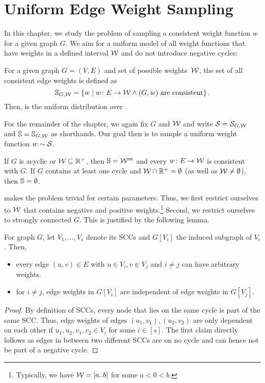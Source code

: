 \chapter{Uniform Edge Weight Sampling}\label{sec:uniform_sampling}

In this chapter, we study the problem of sampling a consistent weight function $w$ for a given graph $G$.
We aim for a uniform model of all weight functions that have weights in a defined interval $\mathcal W$ and do not introduce negative cycles:

\begin{definition}
  For a given graph $G = (V, E)$ and set of possible weights~$\mathcal W$, the set of all consistent edge weights \constates is defined as \[
    \mathbb{S}_{G, \mathcal W} = \left\{w \mid w\colon E \rightarrow \mathcal W \land \text{$(G, w)$ are consistent}\right\}.
  \]
  Then, \consdistr is the uniform distribution over \constates.
\end{definition}

\noindent For the remainder of the chapter, we again fix $G$ and $\mathcal W$ and write $\mathcal{S} = \mathcal{S}_{G, \mathcal W}$ and $\mathbb S = \mathbb{S}_{G, \mathcal W}$ as shorthands.
Our goal then is to sample a uniform weight function $w \sim \mathcal{S}$.

\begin{observation}\label{obs:trivial_sampling}
  If $G$ is acyclic or $\mathcal W \subseteq \mathbb{R}^+$, then $\mathbb S = \mathcal W^m$ and every $w\colon E \rightarrow \mathcal W$ is consistent with $G$.
  If $G$ contains at least one cycle and $\mathcal W \cap \mathbb{R}^+ = \emptyset$ (as well as $\mathcal W \neq \emptyset$), then $\mathbb S = \emptyset$.
\end{observation}

\noindent {} makes the problem trivial for certain parameters.
Thus, we first restrict ourselves to $\mathcal W$ that contains negative and positive weights.\footnote{
  Typically, we have $\mathcal W = [a..b]$ for some $a < 0 < b$.
}
Second, we restrict ourselves to strongly connected $G$.
This is justified by the following lemma.

\begin{lemma}\label{lem:scc_dependent_weights}
  For graph $G$, let $V_1, \ldots, V_s$ denote its SCCs and $G[V_i]$ the induced subgraph of $V_i$.
  Then, \begin{itemize}
    \item every edge $(u, v) \in E$ with $u \in V_i, v \in V_j$ and $i \neq j$ can have arbitrary weights.
    \item for $i \neq j$, edge weights in $G[V_i]$ are independent of edge weights in $G[V_j]$.
  \end{itemize}
\end{lemma}
\begin{proof}
  By definition of SCCs, every node that lies on the same cycle is part of the same SCC.
  Thus, edge weights of edges $(u_1, v_1), (u_2, v_2)$ are only dependent on each other if $u_1, u_2, v_1, v_2 \in V_i$ for some $i \in [s]$.
  The first claim directly follows as edges in between two different SCCs are on no cycle and can hence not be part of a negative cycle.
\end{proof}

